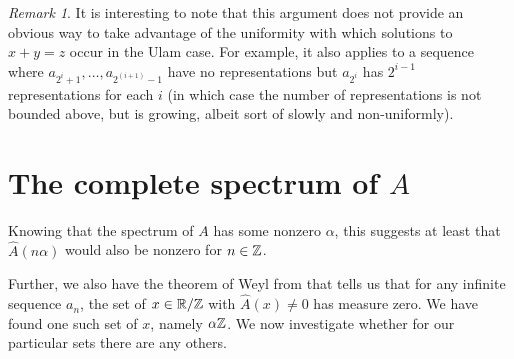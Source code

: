\documentclass{report}
\theoremstyle{remark}
\newtheorem{remark}{Remark}
\numberwithin{equation}{section}
\begin{document}

\begin{remark}
  It is interesting to note that this argument does not provide an
  obvious way to take advantage of the uniformity with which solutions
  to $x+y=z$ occur in the Ulam case.  For example, it also applies to
  a sequence where $a_{2^i+1}, \ldots, a_{2^(i+1)-1}$ have no
  representations but $a_{2^i}$ has $2^{i-1}$ representations for each
  $i$ (in which case the number of representations is not bounded
  above, but is growing, albeit sort of slowly and non-uniformly).
\end{remark}

\section{The complete spectrum of $A$}

Knowing that the spectrum of $A$ has some nonzero $\alpha$, this
suggests at least that $\widehat{A}(n\alpha)$ would also be nonzero
for $n \in \mathbb{Z}$.  

Further, we also have the theorem of Weyl from \cite{weyl:ann1916}
that tells us that for any infinite sequence $a_n$, the set of
$x \in \mathbb{R}/\mathbb{Z}$ with $\widehat{A}(x) \neq 0$ has measure zero.  We have
found one such set of $x$, namely $\alpha\mathbb{Z}$.  We now investigate
whether for our particular \relevant sets there are any others.
\end{document}
